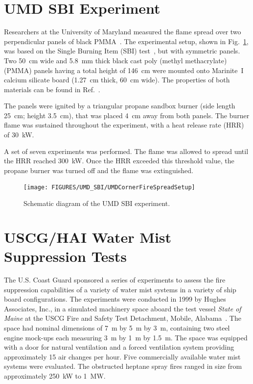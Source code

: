 \section{UMD SBI Experiment}
\label{UMD_SBI_Description}

Researchers at the University of Maryland measured the flame spread over two perpendicular panels of black PMMA~\cite{Chaudhari:2021}.  The experimental setup, shown in Fig.~\ref{UMD_SBI_Schematic}, was based on the Single Burning Item (SBI) test~\cite{SBI}, but with symmetric panels. Two 50~cm wide and 5.8~mm thick black cast poly (methyl methacrylate) (PMMA) panels having a total height of 146~cm were mounted onto Marinite~I calcium silicate board (1.27~cm thick, 60~cm wide). The properties of both materials can be found in Ref.~\cite{Chaudhari:2021}.

The panels were ignited by a triangular propane sandbox burner (side length 25~cm; height 3.5~cm), that was placed 4~cm away from both panels. The burner flame was sustained throughout the experiment, with a heat release rate (HRR) of 30~kW.

A set of seven experiments was performed. The flame was allowed to spread until the HRR reached 300~kW. Once the HRR exceeded this threshold value, the propane burner was turned off and the flame was extinguished.

\begin{figure}[!ht]
\texttt{[image: FIGURES/UMD\_SBI/UMDCornerFireSpreadSetup]}
\caption[Schematic diagram of the UMD SBI experiment.]{Schematic diagram of the UMD SBI experiment.}
\label{UMD_SBI_Schematic}
\end{figure}



\section{USCG/HAI Water Mist Suppression Tests}
\label{USCG_HAI_Water_Mist_Description}

The U.S. Coast Guard sponsored a series of experiments to assess the fire suppression capabilities of a variety of water mist systems in a variety of ship board configurations. The experiments were conducted in 1999 by Hughes Associates, Inc., in a simulated machinery space aboard the test vessel {\em State of Maine} at the USCG Fire and Safety Test Detachment, Mobile, Alabama~\cite{Back:USCG1999}. The space had nominal dimensions of 7~m by 5~m by 3~m, containing two steel engine mock-ups each measuring 3~m by 1~m by 1.5~m. The space was equipped with a door for natural ventilation and a forced ventilation system providing approximately 15 air changes per hour. Five commercially available water mist systems were evaluated. The obstructed heptane spray fires ranged in size from approximately 250~kW to 1~MW.


